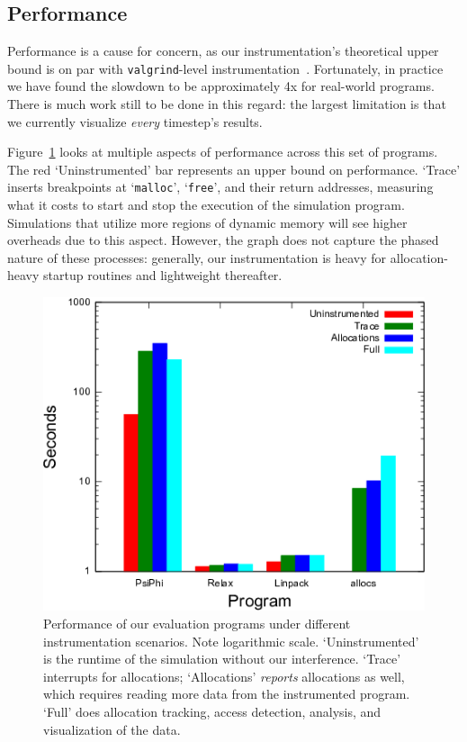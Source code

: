 \subsection{Performance}
\label{sec:performance}

Performance is a cause for concern, as our instrumentation's
theoretical upper
bound is on par with \texttt{valgrind}-level
instrumentation~\cite{Nethercote:2007:Valgrind}.  Fortunately, in
practice we have found the slowdown to be approximately 4x for
real-world programs.  There is much work still to be done in this
regard: the largest
limitation is that we currently visualize \emph{every} timestep's
results.

Figure~\ref{fig:performance} looks at multiple aspects of performance
across this set of programs.  The red `Uninstrumented' bar represents
an upper bound on performance.  `Trace' inserts breakpoints at
`\texttt{malloc}', `\texttt{free}', and their return addresses,
measuring what it costs to start and stop the execution of the
simulation program.  Simulations that utilize more regions of dynamic
memory will see higher overheads due to this aspect.  However, the
graph does not capture the phased nature of these processes: generally,
our instrumentation is heavy for allocation-heavy startup routines and
lightweight thereafter.


\begin{figure}
  \includegraphics[width=\linewidth]{images/dbg/mtrace/performance}

  \caption{Performance of our evaluation programs under different
  instrumentation scenarios. Note logarithmic scale.  `Uninstrumented'
  is the runtime of the simulation without our interference. `Trace'
  interrupts for allocations; `Allocations' \emph{reports} allocations
  as well, which requires reading more data from the instrumented
  program.  `Full' does allocation tracking, access detection,
  analysis, and visualization of the data.}

  \label{fig:performance}
\end{figure}


